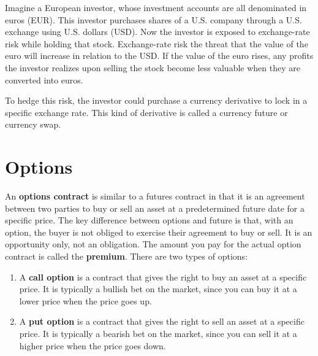 \documentclass{article}
\begin{document}
  \begin{example}
    Imagine a European investor, whose investment accounts are all denominated in euros (EUR). This investor purchases shares of a U.S. company through a U.S. exchange using U.S. dollars (USD). Now the investor is exposed to exchange-rate risk while holding that stock. Exchange-rate risk the threat that the value of the euro will increase in relation to the USD. If the value of the euro rises, any profits the investor realizes upon selling the stock become less valuable when they are converted into euros.

    To hedge this risk, the investor could purchase a currency derivative to lock in a specific exchange rate. This kind of derivative is called a currency future or currency swap. 
  \end{example}

\section{Options}

  \begin{definition}[Options]
    An \textbf{options contract} is similar to a futures contract in that it is an agreement between two parties to buy or sell an asset at a predetermined future date for a specific price. The key difference between options and future is that, with an option, the buyer is not obliged to exercise their agreement to buy or sell. It is an opportunity only, not an obligation. The amount you pay for the actual option contract is called the \textbf{premium}. There are two types of options: 
    \begin{enumerate}
      \item A \textbf{call option} is a contract that gives the right to buy an asset at a specific price. It is typically a bullish bet on the market, since you can buy it at a lower price when the price goes up. 
      \item A \textbf{put option} is a contract that gives the right to sell an asset at a specific price. It is typically a bearish bet on the market, since you can sell it at a higher price when the price goes down. 
    \end{enumerate}
  \end{definition}
\end{document}
